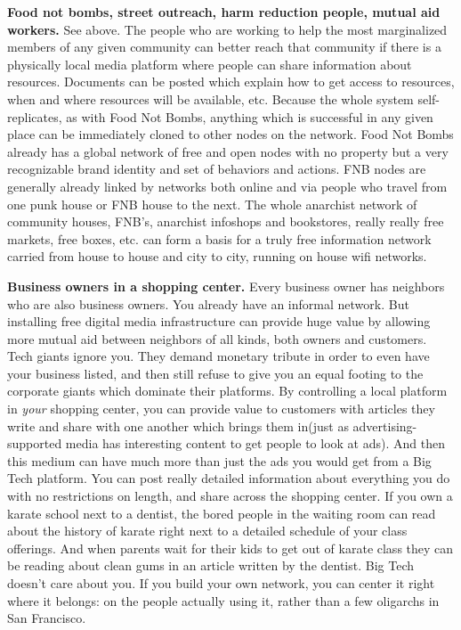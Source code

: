 \documentclass{report}
\begin{document}
\textbf{Food not bombs, street outreach, harm reduction people, mutual
aid workers.} See above. The people who are working to help the most
marginalized members of any given community can better reach that
community if there is a physically local media platform where people can
share information about resources. Documents can be posted which explain
how to get access to resources, when and where resources will be
available, etc. Because the whole system self-replicates, as with Food
Not Bombs, anything which is successful in any given place can be
immediately cloned to other nodes on the network. Food Not Bombs already
has a global network of free and open nodes with no property but a very
recognizable brand identity and set of behaviors and actions. FNB nodes
are generally already linked by networks both online and via people who
travel from one punk house or FNB house to the next. The whole anarchist
network of community houses, FNB's, anarchist infoshops and bookstores,
really really free markets, free boxes, etc. can form a basis for a
truly free information network carried from house to house and city to
city, running on house wifi networks.

\textbf{Business owners in a shopping center.} Every business owner has
neighbors who are also business owners. You already have an informal
network. But installing free digital media infrastructure can provide
huge value by allowing more mutual aid between neighbors of all kinds,
both owners and customers. Tech giants ignore you. They demand monetary
tribute in order to even have your business listed, and then still
refuse to give you an equal footing to the corporate giants which
dominate their platforms. By controlling a local platform in \emph{your}
shopping center, you can provide value to customers with articles they
write and share with one another which brings them in(just as
advertising-supported media has interesting content to get people to
look at ads). And then this medium can have much more than just the ads
you would get from a Big Tech platform. You can post really detailed
information about everything you do with no restrictions on length, and
share across the shopping center. If you own a karate school next to a
dentist, the bored people in the waiting room can read about the history
of karate right next to a detailed schedule of your class offerings. And
when parents wait for their kids to get out of karate class they can be
reading about clean gums in an article written by the dentist. Big Tech
doesn't care about you. If you build your own network, you can center it
right where it belongs: on the people actually using it, rather than a
few oligarchs in San Francisco.
\end{document}

